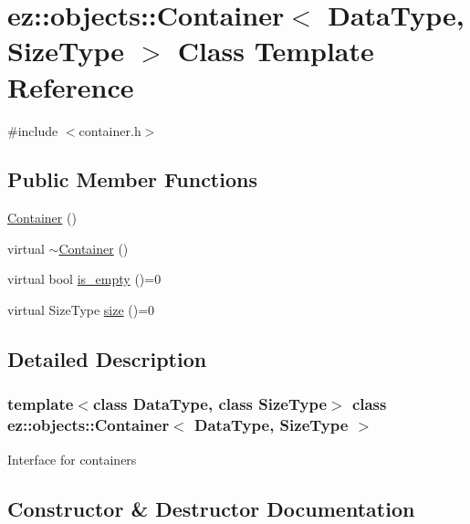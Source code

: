 \hypertarget{classez_1_1objects_1_1Container}{}\section{ez\+:\+:objects\+:\+:Container$<$ Data\+Type, Size\+Type $>$ Class Template Reference}
\label{classez_1_1objects_1_1Container}


{\ttfamily \#include $<$container.\+h$>$}

\subsection*{Public Member Functions}
\begin{DoxyCompactItemize}
\item 
\hyperlink{classez_1_1objects_1_1Container_a44cdb3a034eeca53582f994776f88e40}{Container} ()
\item 
virtual \hyperlink{classez_1_1objects_1_1Container_a26449bfdccdbf9aea44bc5973a085ff8}{$\sim$\+Container} ()
\item 
virtual bool \hyperlink{classez_1_1objects_1_1Container_a205eb4f8a4fe967d425fdf04e5db5f93}{is\+\_\+empty} ()=0
\item 
virtual Size\+Type \hyperlink{classez_1_1objects_1_1Container_affd294810c6c29530d1d1e3c2151ad28}{size} ()=0
\end{DoxyCompactItemize}


\subsection{Detailed Description}
\subsubsection*{template$<$class Data\+Type, class Size\+Type$>$\newline
class ez\+::objects\+::\+Container$<$ Data\+Type, Size\+Type $>$}

Interface for containers 

\subsection{Constructor \& Destructor Documentation}
\mbox{\label{classez_1_1objects_1_1Container_a44cdb3a034eeca53582f994776f88e40}} 
